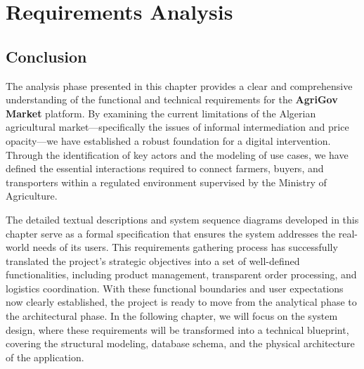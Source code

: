 
\chapter{Requirements Analysis}














\section{Conclusion}

The analysis phase presented in this chapter provides a clear and comprehensive understanding of the functional and technical requirements for the \textbf{AgriGov Market} platform. By examining the current limitations of the Algerian agricultural market—specifically the issues of informal intermediation and price opacity—we have established a robust foundation for a digital intervention. Through the identification of key actors and the modeling of use cases, we have defined the essential interactions required to connect farmers, buyers, and transporters within a regulated environment supervised by the Ministry of Agriculture.

The detailed textual descriptions and system sequence diagrams developed in this chapter serve as a formal specification that ensures the system addresses the real-world needs of its users. This requirements gathering process has successfully translated the project’s strategic objectives into a set of well-defined functionalities, including product management, transparent order processing, and logistics coordination. With these functional boundaries and user expectations now clearly established, the project is ready to move from the analytical phase to the architectural phase. In the following chapter, we will focus on the system design, where these requirements will be transformed into a technical blueprint, covering the structural modeling, database schema, and the physical architecture of the application.